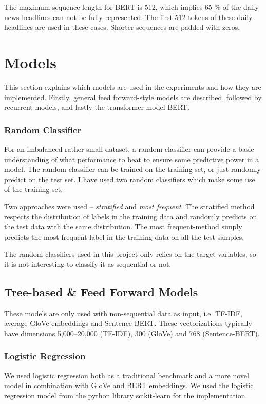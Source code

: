 The maximum sequence length for BERT is 512, which implies 65 \% of the daily news headlines can not be fully represented. The first 512 tokens of these daily headlines are used in these cases. Shorter sequences are padded with zeros.  

\section{Models}

This section explains which models are used in the experiments and how they are implemented.  Firstly, general feed forward-style models are described, followed by recurrent models, and lastly the transformer model BERT.  

\subsubsection{Random Classifier}

For an imbalanced rather small dataset, a random classifier can provide a basic understanding of what performance to beat to ensure some predictive power in a model. The random classifier can be trained on the training set, or just randomly predict on the test set. I have used two random classifiers which make some use of the training set. 

Two approaches were used -- \emph{stratified} and \emph{most frequent}. The stratified method respects the distribution of labels in the training data and randomly predicts on the test data with the same distribution. The most frequent-method simply predicts the most frequent label in the training data on all the test samples.

The random classifiers used in this project only relies on the target variables, so it is not interesting to classify it as sequential or not.  

\subsection{Tree-based \& Feed Forward Models}

These models are only used with non-sequential data as input, i.e. TF-IDF, average GloVe embeddings and Sentence-BERT. These vectorizations typically have dimensions 5,000--20,000 (TF-IDF), 300 (GloVe) and 768 (Sentence-BERT). 


\subsubsection{Logistic Regression}
We used logistic regression both as a traditional benchmark and a more novel model in combination with GloVe and BERT embeddings. We used the logistic regression model from the python library scikit-learn  for the implementation.

